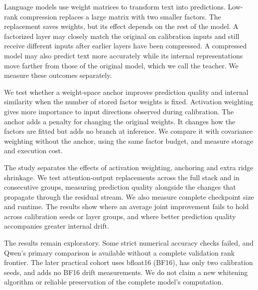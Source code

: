 \documentclass[10pt,a4paper,twocolumn]{article}
\makeatletter
\renewcommand\section{\@startsection{section}{1}{0pt}{2.2ex plus 1ex minus .2ex}{1.1ex plus .2ex}{\normalfont\normalsize\bfseries\centering}}
\makeatother
\begin{document}
\section{Introduction}
Language models use weight matrices to transform text into predictions. Low-rank compression replaces a large matrix with two smaller factors. The replacement saves weights, but its effect depends on the rest of the model. A factorized layer may closely match the original on calibration inputs and still receive different inputs after earlier layers have been compressed. A compressed model may also predict text more accurately while its internal representations move farther from those of the original model, which we call the teacher. We measure these outcomes separately.\par\smallskip
We test whether a weight-space anchor improves prediction quality and internal similarity when the number of stored factor weights is fixed. Activation weighting gives more importance to input directions observed during calibration. The anchor adds a penalty for changing the original weights. It changes how the factors are fitted but adds no branch at inference. We compare it with covariance weighting without the anchor, using the same factor budget, and measure storage and execution cost.\par\smallskip
The study separates the effects of activation weighting, anchoring and extra ridge shrinkage. We test attention-output replacements across the full stack and in consecutive groups, measuring prediction quality alongside the changes that propagate through the residual stream. We also measure complete checkpoint size and runtime. The results show where an average joint improvement fails to hold across calibration seeds or layer groups, and where better prediction quality accompanies greater internal drift.\par\smallskip
The results remain exploratory. Some strict numerical accuracy checks failed, and Qwen's primary comparison is available without a complete validation rank frontier. The later practical cohort uses bfloat16 (BF16), has only two calibration seeds, and adds no BF16 drift measurements. We do not claim a new whitening algorithm or reliable preservation of the complete model's computation.\par\smallskip
\end{document}
